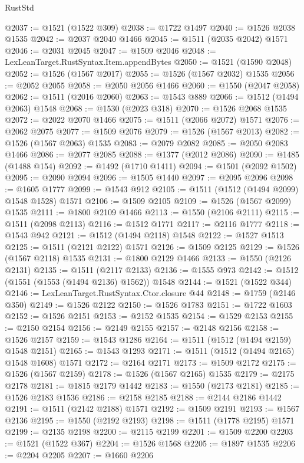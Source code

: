 \begin{lexlean}{RustStd}
\begin{coremodule}
{\begin{coremodule}
{{{{{{{{{{{{{{{{{{{{{{{{{{{{{{{{{{{@2037 := @1521 (@1522 @309)
@2038 := @1722 @1497
@2040 := @1526 @2038 @1535
@2042 := @2037 @2040 @1466
@2045 := @1511 (@2035 @2042) @1571
@2046 := @2031 @2045
@2047 := @1509 @2046
@2048 := LexLeanTarget.RustSyntax.Item.appendBytes
@2050 := @1521 (@1590 @2048)
@2052 := @1526 (@1567 @2017)
@2055 := @1526 (@1567 @2032) @1535
@2056 := @2052 @2055
@2058 := @2050 @2056 @1466
@2060 := @1550 (@2047 @2058)
@2062 := @1511 (@2016 @2060)
@2063 := @1543 @889
@2066 := @1512 (@1494 @2063) @1548
@2068 := @1530 (@2023 @318)
@2070 := @1526 @2068 @1535
@2072 := @2022 @2070 @1466
@2075 := @1511 (@2066 @2072) @1571
@2076 := @2062 @2075
@2077 := @1509 @2076
@2079 := @1526 (@1567 @2013)
@2082 := @1526 (@1567 @2063) @1535
@2083 := @2079 @2082
@2085 := @2050 @2083 @1466
@2086 := @2077 @2085
@2088 := @1377 (@2012 @2086)
@2090 := @1485 (@1488 @154)
@2092 := @1492 (@1710 @1411)
@2094 := @1501 (@2092 @1502)
@2095 := @2090 @2094
@2096 := @1505 @1440
@2097 := @2095 @2096
@2098 := @1605 @1777
@2099 := @1543 @912
@2105 := @1511 (@1512 (@1494 @2099) @1548 @1528) @1571
@2106 := @1509 @2105
@2109 := @1526 (@1567 @2099) @1535
@2111 := @1800 @2109 @1466
@2113 := @1550 (@2106 @2111)
@2115 := @1511 (@2098 @2113)
@2116 := @1512 @1771
@2117 := @2116 @1777
@2118 := @1543 @942
@2121 := @1512 (@1494 @2118) @1548
@2122 := @1527 @1513
@2125 := @1511 (@2121 @2122) @1571
@2126 := @1509 @2125
@2129 := @1526 (@1567 @2118) @1535
@2131 := @1800 @2129 @1466
@2133 := @1550 (@2126 @2131)
@2135 := @1511 (@2117 @2133)
@2136 := @1555 @973
@2142 := @1512 (@1551 (@1553 (@1494 @2136) @1562)) @1548
@2144 := @1521 (@1522 @344)
@2146 := LexLeanTarget.RustSyntax.Ctor.closure @44
@2148 := @1759 (@2146 @350)
@2149 := @1526 @2122
@2150 := @1526 @1783
@2151 := @1722 @1603
@2152 := @1526 @2151
@2153 := @2152 @1535
@2154 := @1529 @2153
@2155 := @2150 @2154
@2156 := @2149 @2155
@2157 := @2148 @2156
@2158 := @1526 @2157
@2159 := @1543 @1286
@2164 := @1511 (@1512 (@1494 @2159) @1548 @2151)
@2165 := @1543 @1293
@2171 := @1511 (@1512 (@1494 @2165) @1548 @1608) @1571
@2172 := @2164 @2171
@2173 := @1509 @2172
@2175 := @1526 (@1567 @2159)
@2178 := @1526 (@1567 @2165) @1535
@2179 := @2175 @2178
@2181 := @1815 @2179 @1442
@2183 := @1550 (@2173 @2181)
@2185 := @1526 @2183 @1536
@2186 := @2158 @2185
@2188 := @2144 @2186 @1442
@2191 := @1511 (@2142 @2188) @1571
@2192 := @1509 @2191
@2193 := @1567 @2136
@2195 := @1550 (@2192 @2193)
@2198 := @1511 (@1778 @2195) @1571
@2199 := @2135 @2198
@2200 := @2115 @2199
@2201 := @1509 @2200
@2203 := @1521 (@1522 @367)
@2204 := @1526 @1568
@2205 := @1897 @1535
@2206 := @2204 @2205
@2207 := @1660 @2206
}}}}}}}}}}}}}}}}}}}}}}}}}}}}}}}}}}}
\end{coremodule}}
\end{coremodule}
\end{lexlean}
